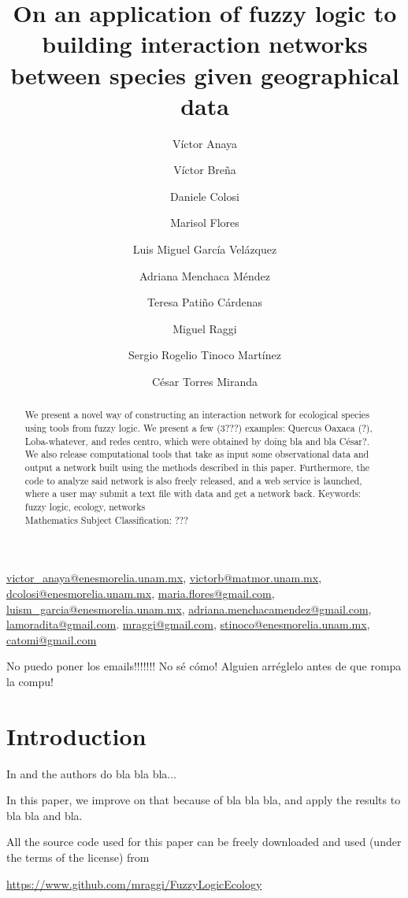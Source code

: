 \documentclass[12pt]{article}
\title{On an application of fuzzy logic to building interaction networks between species given geographical data}
\author[1]{Víctor Anaya}
\author[2]{Víctor Breña}
\author[1]{Daniele Colosi}
\author[1]{Marisol Flores}
\author[1]{Luis Miguel García Velázquez}
\author[1]{Adriana Menchaca Méndez}
\author[2]{Teresa Patiño Cárdenas}
\author[1]{Miguel Raggi}
\author[1]{Sergio Rogelio Tinoco Martínez}
\author[1]{César Torres Miranda}
\affil[1]{Escuela Nacional de Estudios Superiores, Unidad Morelia, UNAM}
\affil[2]{Centro de Ciencias Matemáticas, UNAM}
\numberwithin{equation}{section} %
\numberwithin{figure}{section} %
\theoremstyle{definition}
\def\tcr#1{\textcolor{MyRed}{#1}}
\begin{document}
\maketitle

\href{mailto:victor_anaya@enesmorelia.unam.mx}{victor\_anaya@enesmorelia.unam.mx}, \href{mailto:victorb@matmor.unam.mx}{victorb@matmor.unam.mx}, \href{mailto:dcolosi@enesmorelia.unam.mx}{dcolosi@enesmorelia.unam.mx}, \href{mailto:maria.flores@gmail.com}{maria.flores@gmail.com}, \href{mailto:luism\_garcia@enesmorelia.unam.mx}{luism\_garcia@enesmorelia.unam.mx}, \href{mailto:adriana.menchacamendez@gmail.com}{adriana.menchacamendez@gmail.com}, \href{mailto:lamoradita@gmail.com}{lamoradita@gmail.com}. \href{mailto:mraggi@gmail.com}{mraggi@gmail.com}, \href{mailto:stinoco@enesmorelia.unam.mx}{stinoco@enesmorelia.unam.mx}, \href{mailto:catomi@gmail.com}{catomi@gmail.com}

\tcr{No puedo poner los emails!!!!!!! No sé cómo! Alguien arréglelo antes de que rompa la compu!}
\begin{abstract}
	We present a novel way of constructing an interaction network for ecological species using tools from fuzzy logic. We present a few (3???) examples: Quercus Oaxaca (?), Loba-whatever, and redes centro, which were obtained by doing bla and bla \tcr{César?}. We also release computational tools that take as input some observational data and output a network built using the methods described in this paper. Furthermore, the code to analyze said network is also freely released, and a web service is launched, where a user may submit a text file with data and get a network back.
	\vspace{5pt}
Keywords: fuzzy logic, ecology, networks\\
 {\small Mathematics Subject Classification: ???} 
\end{abstract}

\section{Introduction}

In \cite{Hola} and \cite{cesarthesis} the authors do bla bla bla...

In this paper, we improve on that because of bla bla bla, and apply the results to bla bla and bla.

All the source code used for this paper can be freely downloaded and used (under the terms of the license) from
\begin{center}
	\url{https://www.github.com/mraggi/FuzzyLogicEcology}
\end{center}
\end{document}
